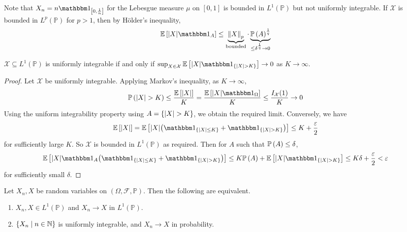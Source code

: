 \begin{remark}
	Note that \( X_n = n\mathbbm 1_{\qty[0,\frac{1}{n}]} \) for the Lebesgue measure \( \mu \) on \( [0,1] \) is bounded in \( L^1(\mathbb P) \) but not uniformly integrable.
	If \( \mathcal X \) is bounded in \( L^p(\mathbb P) \) for \( p > 1 \), then by H\"older's inequality,
	\[ \expect{\abs{X}\mathbbm 1_A} \leq \underbrace{\norm{X}_p}_{\text{bounded}} \cdot \underbrace{\prob{A}^{\frac 1 q}}_{\leq \delta^{\frac 1 q} \to 0} \]
\end{remark}
\begin{lemma}
	\( \mathcal X \subseteq L^1(\mathbb P) \) is uniformly integrable if and only if \( \sup_{X \in \mathcal X} \expect{\abs{X} \mathbbm 1_{\qty{\abs{X} > K}}} \to 0 \) as \( K \to \infty \).
\end{lemma}
\begin{proof}
	Let \( \mathcal X \) be uniformly integrable.
	Applying Markov's inequality, as \( K \to \infty \),
	\[ \prob{\abs{X} > K} \leq \frac{\expect{\abs{X}}}{K} = \frac{\expect{\abs{X}\mathbbm 1_{\Omega}}}{K} \leq \frac{I_{\mathcal X}(1)}{K} \to 0 \]
	Using the uniform integrability property using \( A = \qty{\abs{X} > K} \), we obtain the required limit.
	Conversely, we have
	\[ \expect{\abs{X}} = \expect{\abs{X}\qty(\mathbbm 1_{\qty{\abs{X} \leq K}} + \mathbbm 1_{\qty{\abs{X} > K}})} \leq K + \frac{\varepsilon}{2} \]
	for sufficiently large \( K \).
	So \( \mathcal X \) is bounded in \( L^1(\mathbb P) \) as required.
	Then for \( A \) such that \( \mathbb{P}\left({A}\right) \leq \delta \),
	\[ \expect{\abs{X}\mathbbm 1_A\qty(\mathbbm 1_{\qty{\abs{X} \leq K}} + \mathbbm 1_{\qty{\abs{X} > K}})} \leq K\prob{A} + \expect{\abs{X}\mathbbm 1_{\qty{\abs{X} > K}}} \leq K\delta + \frac{\varepsilon}{2} < \varepsilon \]
	for sufficiently small \( \delta \).
\end{proof}
\begin{theorem}
	Let \( X_n, X \) be random variables on \( (\Omega, \mathcal F, \mathbb P) \).
	Then the following are equivalent.
	\begin{enumerate}
		\item \( X_n, X \in L^1(\mathbb P) \) and \( X_n \to X \) in \( L^1(\mathbb P) \).
		\item \( \qty{X_n \mid n \in \mathbb N} \) is uniformly integrable, and \( X_n \to X \) in probability.
	\end{enumerate}
\end{theorem}
